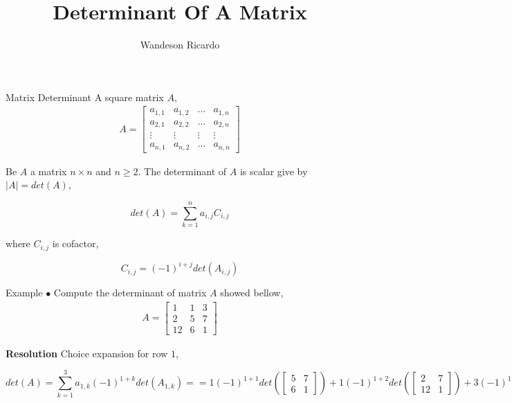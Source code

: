 \documentclass[12pt]{beamer}
\title{Determinant Of A Matrix}
\author{Wandeson Ricardo}
\begin{document}
	\maketitle
	\begin{frame}{Matrix Determinant}
		A square matrix $A$,
		\begin{align}
			A = 
			\begin{bmatrix}
				a_{1,1} & a_{1,2} & ... & a_{1,n} \\
				a_{2,1} & a_{2,2} & ... & a_{2,n} \\
				\vdots & \vdots & \vdots & \vdots \\
				a_{n,1} & a_{n,2} & \ldots & a_{n,n} 
			\end{bmatrix}
		\end{align}

		\begin{definition}
			Be $A$ a matrix $n \times n$ and $ n \geqslant 2 $. The determinant of $A$ is scalar give by $|A| = det(A)$, 
			
			$$ det(A) = \sum_{k=1}^{n} a_{i,j} C_{i,j}$$

			where $C_{i,j}$ is cofactor,

			$$ C_{i,j} = (-1)^{i+j} det( A_{i,j} )$$			
		\end{definition}
	\end{frame}

	\begin{frame}{Example}
		$\bullet$ Compute the determinant of matrix $A$ showed bellow,
		\begin{align*}
			A =
			\begin{bmatrix}
				1 & 1 & 3 \\
				2 & 5 & 7 \\
				12 & 6 & 1
			\end{bmatrix}
		\end{align*}
	
		\textbf{ Resolution} 
		Choice expansion for row $1$,
		
		\begin{equation*}
			det(A) = \sum_{k=1}^{3} a_{1,k} (-1)^{1+k} det\left( A_{1,k} \right) = 
			
			= 1 (-1)^{1+1 }det \left(
			 \begin{bmatrix}
				5 & 7 \\
				6 & 1	
			\end{bmatrix} \right)  + 1 (-1)^{1+2} det \left(
			\begin{bmatrix}
				2 & 7 \\
				12 & 1
			\end{bmatrix} \right) + 
			3 (-1)^{1+3} det \left( 
			\begin{bmatrix}
				2 & 5 \\
				12 & 6
			\end{bmatrix}
			\right) = 
			
			=  1 \cdot ( 5 \cdot 1 - 7 \cdot 6 )  + (-1)( 2 \cdot 1 - 7 \cdot 12 ) + 3 \cdot 1 \cdot (2 \cdot 6 - 5 \cdot 12 ) = 
			
			= -37 + 82  - 144 = \boxed{-99} 
			
		\end{equation*}

	\end{frame}
\end{document}
